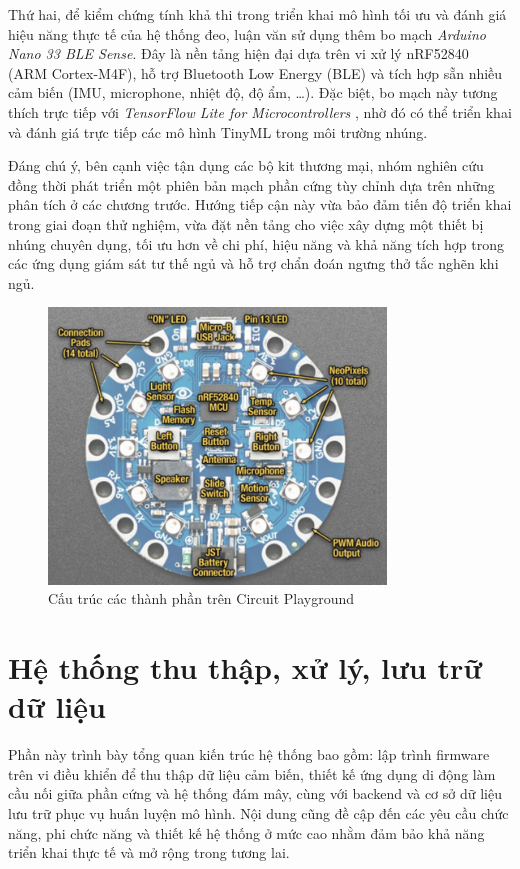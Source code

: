 Thứ hai, để kiểm chứng tính khả thi trong triển khai mô hình tối ưu và đánh 
giá hiệu năng thực tế của hệ thống đeo, luận văn sử dụng thêm bo mạch 
\textit{Arduino Nano 33 BLE Sense}. Đây là nền tảng hiện đại dựa trên vi 
xử lý nRF52840 (ARM Cortex-M4F), hỗ trợ Bluetooth Low Energy (BLE) và 
tích hợp sẵn nhiều cảm biến (IMU, microphone, nhiệt độ, độ ẩm, \ldots). 
Đặc biệt, bo mạch này tương thích trực tiếp với \textit{TensorFlow Lite for 
Microcontrollers} \cite{nano33ble}, nhờ đó có thể triển khai và đánh giá trực 
tiếp các mô hình TinyML trong môi trường nhúng.  

Đáng chú ý, bên cạnh việc tận dụng các bộ kit thương mại, nhóm nghiên cứu 
đồng thời phát triển một phiên bản mạch phần cứng tùy chỉnh dựa trên những 
phân tích ở các chương trước. Hướng tiếp cận này vừa bảo đảm tiến độ triển 
khai trong giai đoạn thử nghiệm, vừa đặt nền tảng cho việc xây dựng một 
thiết bị nhúng chuyên dụng, tối ưu hơn về chi phí, hiệu năng và khả năng 
tích hợp trong các ứng dụng giám sát tư thế ngủ và hỗ trợ chẩn đoán ngưng 
thở tắc nghẽn khi ngủ.  

\begin{figure}[htbp]
    \centering
    \includegraphics[width=0.8\textwidth]{images/detail_ada.png}
    \caption{Cấu trúc các thành phần trên Circuit Playground}
    \label{detail_ada}
\end{figure}



\section{Hệ thống thu thập, xử lý, lưu trữ dữ liệu}
Phần này trình bày tổng quan kiến trúc hệ thống bao gồm: 
lập trình firmware trên vi điều khiển để thu thập dữ liệu cảm biến, 
thiết kế ứng dụng di động làm cầu nối giữa phần cứng và hệ thống đám mây, 
cùng với backend và cơ sở dữ liệu lưu trữ phục vụ huấn luyện mô hình. 
Nội dung cũng đề cập đến các yêu cầu chức năng, phi chức năng và 
thiết kế hệ thống ở mức cao nhằm đảm bảo khả năng triển khai thực 
tế và mở rộng trong tương lai.

